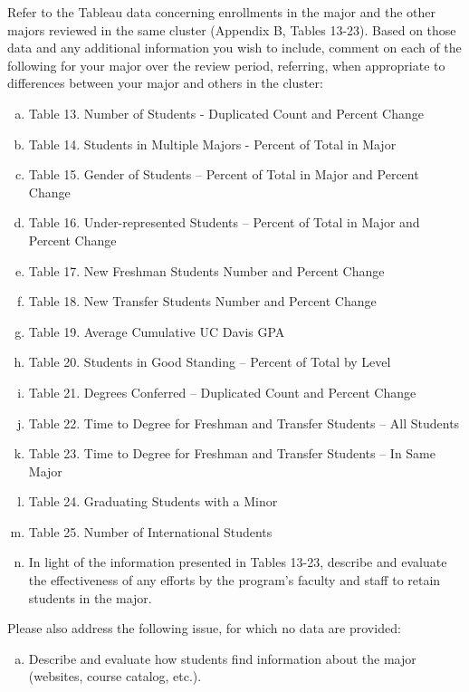 \documentclass[12pt]{article}
\begin{document}
Refer to the Tableau data concerning enrollments in the major and the other majors reviewed in the same cluster (Appendix B, Tables 13-23). Based on those data and any additional information you wish to include, comment on each of the following for your major over the review period, referring, when appropriate to differences between your major and others in the cluster:
\begin{enumerate}[a)]
    \item Table 13.  Number of Students - Duplicated Count and Percent Change 
    \item Table 14.  Students in Multiple Majors - Percent of Total in Major 
    \item Table 15.  Gender of Students – Percent of Total in Major and Percent Change 
    \item Table 16.  Under-represented Students – Percent of Total in Major and Percent Change 
    \item Table 17.  New Freshman Students Number and Percent Change 
    \item Table 18.  New Transfer Students Number and Percent Change 
    \item Table 19.  Average Cumulative UC Davis GPA 
    \item Table 20.  Students in Good Standing – Percent of Total by Level 
    \item Table 21.  Degrees Conferred – Duplicated Count and Percent Change 
    \item Table 22.  Time to Degree for Freshman and Transfer Students – All Students 
    \item Table 23.  Time to Degree for Freshman and Transfer Students – In Same Major 
    \item Table 24.  Graduating Students with a Minor
    \item Table 25.  Number of International Students
    \item In light of the information presented in Tables 13-23, describe and evaluate the effectiveness of any efforts by the program’s faculty and staff to retain students in the major.
\end{enumerate}

Please also address the following issue, for which no data are provided:
\begin{enumerate}[o)]
    \item Describe and evaluate how students find information about the major (websites, course catalog, etc.).
\end{enumerate}
\end{document}
